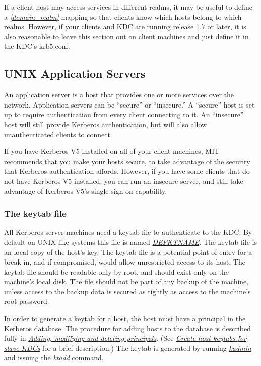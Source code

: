 \documentclass[letterpaper,10pt,english]{sphinxmanual}
\begin{document}
If a client host may access services in different realms, it may be
useful to define a {\hyperref[admin/conf_files/krb5_conf:domain-realm]{\emph{{[}domain\_realm{]}}}} mapping so that clients know
which hosts belong to which realms.  However, if your clients and KDC
are running release 1.7 or later, it is also reasonable to leave this
section out on client machines and just define it in the KDC's
krb5.conf.


\subsection{UNIX Application Servers}
\label{admin/install_appl_srv:unix-application-servers}\label{admin/install_appl_srv::doc}
An application server is a host that provides one or more services
over the network.  Application servers can be ``secure'' or ``insecure.''
A ``secure'' host is set up to require authentication from every client
connecting to it.  An ``insecure'' host will still provide Kerberos
authentication, but will also allow unauthenticated clients to
connect.

If you have Kerberos V5 installed on all of your client machines, MIT
recommends that you make your hosts secure, to take advantage of the
security that Kerberos authentication affords.  However, if you have
some clients that do not have Kerberos V5 installed, you can run an
insecure server, and still take advantage of Kerberos V5's single
sign-on capability.


\subsubsection{The keytab file}
\label{admin/install_appl_srv:the-keytab-file}\label{admin/install_appl_srv:keytab-file}
All Kerberos server machines need a keytab file to authenticate to the
KDC.  By default on UNIX-like systems this file is named {\hyperref[mitK5defaults:paths]{\emph{DEFKTNAME}}}.
The keytab file is an local copy of the host's key.  The keytab file
is a potential point of entry for a break-in, and if compromised,
would allow unrestricted access to its host.  The keytab file should
be readable only by root, and should exist only on the machine's local
disk.  The file should not be part of any backup of the machine,
unless access to the backup data is secured as tightly as access to
the machine's root password.

In order to generate a keytab for a host, the host must have a
principal in the Kerberos database.  The procedure for adding hosts to
the database is described fully in {\hyperref[admin/database:add-mod-del-princs]{\emph{Adding, modifying and deleting principals}}}.  (See
{\hyperref[admin/install_kdc:slave-host-key]{\emph{Create host keytabs for slave KDCs}}} for a brief description.)  The keytab is
generated by running {\hyperref[admin/admin_commands/kadmin_local:kadmin-1]{\emph{kadmin}}} and issuing the {\hyperref[admin/admin_commands/kadmin_local:ktadd]{\emph{ktadd}}}
command.
\end{document}
